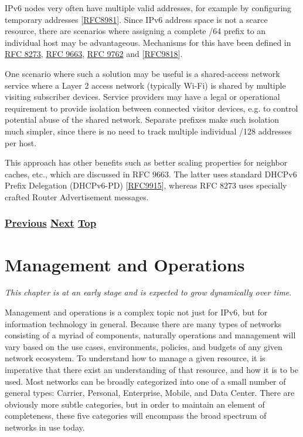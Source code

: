 \documentclass[
]{article}
\begin{document}
IPv6 nodes very often have multiple valid addresses, for example by
configuring temporary addresses
{[}\href{https://www.rfc-editor.org/info/rfc8981}{RFC8981}{]}. Since
IPv6 address space is not a scarce resource, there are scenarios where
assigning a complete /64 prefix to an individual host may be
advantageous. Mechanisms for this have been defined in
\href{https://www.rfc-editor.org/info/rfc8273}{RFC 8273},
\href{https://www.rfc-editor.org/info/rfc9663}{RFC 9663},
\href{https://www.rfc-editor.org/info/rfc9762}{RFC 9762} and
{[}\href{https://www.rfc-editor.org/info/rfc9818}{RFC9818}{]}.

One scenario where such a solution may be useful is a shared-access
network service where a Layer 2 access network (typically Wi-Fi) is
shared by multiple visiting subscriber devices. Service providers may
have a legal or operational requirement to provide isolation between
connected visitor devices, e.g. to control potential abuse of the shared
network. Separate prefixes make such isolation much simpler, since there
is no need to track multiple individual /128 addresses per host.

This approach has other benefits such as better scaling properties for
neighbor caches, etc., which are discussed in RFC 9663. The latter uses
standard DHCPv6 Prefix Delegation (DHCPv6-PD)
{[}\href{https://www.rfc-editor.org/info/rfc9915}{RFC9915}{]}, whereas
RFC 8273 uses specially crafted Router Advertisement messages.

\subsubsection{\texorpdfstring{\hyperref[address-planning]{Previous}
\hyperref[management-and-operations]{Next}
\hyperref[network-design]{Top}}{Previous Next Top}}\label{previous-next-top-26}

\pagebreak

\section{Management and Operations}\label{management-and-operations}

\emph{This chapter is at an early stage and is expected to grow
dynamically over time}.

Management and operations is a complex topic not just for IPv6, but for
information technology in general. Because there are many types of
networks consisting of a myriad of components, naturally operations and
management will vary based on the use cases, environments, policies, and
budgets of any given network ecosystem. To understand how to manage a
given resource, it is imperative that there exist an understanding of
that resource, and how it is to be used. Most networks can be broadly
categorized into one of a small number of general types: Carrier,
Personal, Enterprise, Mobile, and Data Center. There are obviously more
subtle categories, but in order to maintain an element of completeness,
these five categories will encompass the broad spectrum of networks in
use today.
\end{document}
